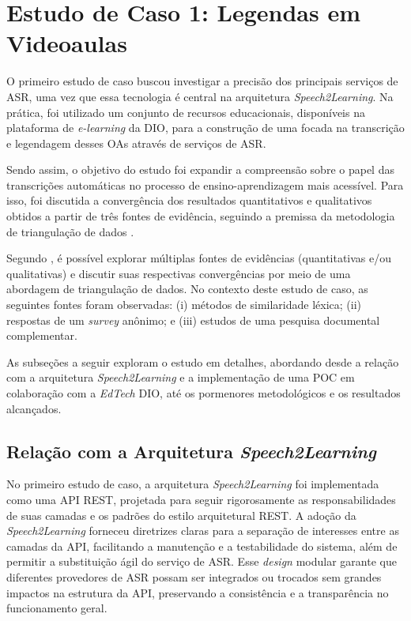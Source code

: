 \section{Estudo de Caso 1: Legendas em Videoaulas}
\label{c4:cs1}

O primeiro estudo de caso buscou investigar a precisão dos principais serviços de ASR, uma vez que essa tecnologia é central na arquitetura \textit{Speech2Learning}. Na prática, foi utilizado um conjunto de recursos educacionais, disponíveis na plataforma de \textit{e-learning} da DIO, para a construção de uma  focada na transcrição e legendagem desses OAs através de serviços de ASR.

Sendo assim, o objetivo do estudo foi expandir a compreensão sobre o papel das transcrições automáticas no processo de ensino-aprendizagem mais acessível. Para isso, foi discutida a convergência dos resultados quantitativos e qualitativos obtidos a partir de três fontes de evidência, seguindo a premissa da metodologia de triangulação de dados \cite{LimaJunior2021}.

Segundo \cite{Farquhar2020}, é possível explorar múltiplas fontes de evidências (quantitativas e/ou qualitativas) e discutir suas respectivas convergências por meio de uma abordagem de triangulação de dados. No contexto deste estudo de caso, as seguintes fontes foram observadas: (i) métodos de similaridade léxica; (ii) respostas de um \textit{survey} anônimo; e (iii) estudos de uma pesquisa documental complementar.

As subseções a seguir exploram o estudo em detalhes, abordando desde a relação com a arquitetura \textit{Speech2Learning} e a implementação de uma POC em colaboração com a \textit{EdTech} DIO, até os pormenores metodológicos e os resultados alcançados.

\subsection{Relação com a Arquitetura \textit{Speech2Learning}}

No primeiro estudo de caso, a arquitetura \textit{Speech2Learning} foi implementada como uma API REST, projetada para seguir rigorosamente as responsabilidades de suas camadas e os padrões do estilo arquitetural REST. A adoção da \textit{Speech2Learning} forneceu diretrizes claras para a separação de interesses entre as camadas da API, facilitando a manutenção e a testabilidade do sistema, além de permitir a substituição ágil do serviço de ASR. Esse \textit{design} modular garante que diferentes provedores de ASR possam ser integrados ou trocados sem grandes impactos na estrutura da API, preservando a consistência e a transparência no funcionamento geral.

